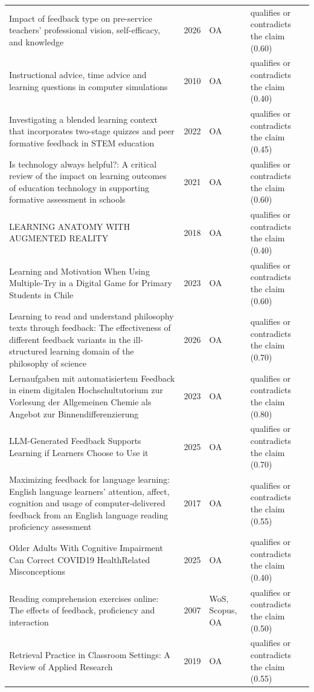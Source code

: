 \begin{longtable}{@{}%
  >{\raggedright\arraybackslash}p{}c%
  >{\raggedright\arraybackslash}p{}%
  >{\raggedright\arraybackslash}p{}@{}}
Impact of feedback type on pre-service teachers' professional vision, self-efficacy, and knowledge & 2026 & OA & qualifies or contradicts the claim (0.60) \\
Instructional advice, time advice and learning questions in computer simulations & 2010 & OA & qualifies or contradicts the claim (0.40) \\
Investigating a blended learning context that incorporates two-stage quizzes and peer formative feedback in STEM education & 2022 & OA & qualifies or contradicts the claim (0.45) \\
Is technology always helpful?: A critical review of the impact on learning outcomes of education technology in supporting formative assessment in schools & 2021 & OA & qualifies or contradicts the claim (0.60) \\
LEARNING ANATOMY WITH AUGMENTED REALITY & 2018 & OA & qualifies or contradicts the claim (0.40) \\
Learning and Motivation When Using Multiple-Try in a Digital Game for Primary Students in Chile & 2023 & OA & qualifies or contradicts the claim (0.60) \\
Learning to read and understand philosophy texts through feedback: The effectiveness of different feedback variants in the ill-structured learning domain of the philosophy of science & 2026 & OA & qualifies or contradicts the claim (0.70) \\
Lernaufgaben mit automatisiertem Feedback in einem digitalen Hochschultutorium zur Vorlesung der Allgemeinen Chemie als Angebot zur Binnendifferenzierung & 2023 & OA & qualifies or contradicts the claim (0.80) \\
LLM-Generated Feedback Supports Learning if Learners Choose to Use it & 2025 & OA & qualifies or contradicts the claim (0.70) \\
Maximizing feedback for language learning: English language learners' attention, affect, cognition and usage of computer-delivered feedback from an English language reading proficiency assessment & 2017 & OA & qualifies or contradicts the claim (0.55) \\
Older Adults With Cognitive Impairment Can Correct COVID19 HealthRelated Misconceptions & 2025 & OA & qualifies or contradicts the claim (0.40) \\
Reading comprehension exercises online: The effects of feedback, proficiency and interaction & 2007 & WoS, Scopus, OA & qualifies or contradicts the claim (0.50) \\
Retrieval Practice in Classroom Settings: A Review of Applied Research & 2019 & OA & qualifies or contradicts the claim (0.55) \\

\end{longtable}

